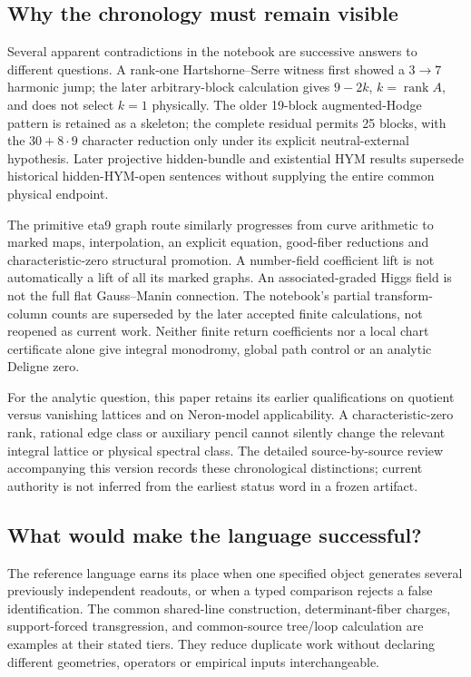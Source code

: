 \documentclass[11pt,a4paper]{article}
\begin{document}
\subsection{Why the chronology must remain visible}
\label{sec:atlas-chronology}

Several apparent contradictions in the notebook are successive answers
to different questions. A rank-one Hartshorne--Serre witness first showed
a \(3\to7\) harmonic jump; the later arbitrary-block calculation gives
\(9-2k\), \(k=\operatorname{rank}A\), and does not select \(k=1\)
physically. The older 19-block augmented-Hodge pattern is retained as a
skeleton; the complete residual permits 25 blocks, with the
\(30+8\cdot9\) character reduction only under its explicit neutral-external
hypothesis. Later projective hidden-bundle and existential HYM results
supersede historical hidden-HYM-open sentences without supplying the
entire common physical endpoint.

The primitive eta9 graph route similarly progresses from curve
arithmetic to marked maps, interpolation, an explicit equation,
good-fiber reductions and characteristic-zero structural promotion.
A number-field coefficient lift is not automatically a lift of all its
marked graphs. An associated-graded Higgs field is not the full flat
Gauss--Manin connection. The notebook's partial transform-column counts
are superseded by the later accepted finite calculations, not
reopened as current work. Neither finite return coefficients nor a
local chart certificate alone give integral monodromy, global path
control or an analytic Deligne zero.

For the analytic question, this paper retains its earlier qualifications
on quotient versus vanishing lattices and on Neron-model applicability.
A characteristic-zero rank, rational edge class or auxiliary pencil
cannot silently change the relevant integral lattice or physical
spectral class. The detailed source-by-source review accompanying this
version records these chronological distinctions; current authority is
not inferred from the earliest status word in a frozen artifact.

\subsection{What would make the language successful?}

The reference language earns its place when one specified object
generates several previously independent readouts, or when a typed
comparison rejects a false identification. The common shared-line
construction, determinant-fiber charges, support-forced transgression,
and common-source tree/loop calculation are examples at their stated
tiers. They reduce duplicate work without declaring different
geometries, operators or empirical inputs interchangeable.
\end{document}
